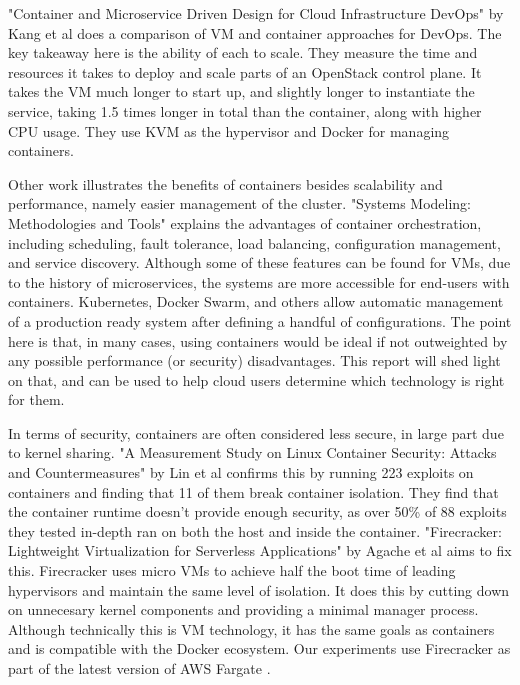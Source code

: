 \documentclass[11pt]{article}
\begin{document}
"Container and Microservice Driven Design for Cloud Infrastructure DevOps" by Kang et al \cite{7484185} does a comparison of VM and container approaches for DevOps. The key takeaway here is the ability of each to scale. They measure the time and resources it takes to deploy and scale parts of an OpenStack control plane. It takes the VM much longer to start up, and slightly longer to instantiate the service, taking 1.5 times longer in total than the container, along with higher CPU usage. They use KVM as the hypervisor and Docker for managing containers.

Other work illustrates the benefits of containers besides scalability and performance, namely easier management of the cluster. "Systems Modeling: Methodologies and Tools" \cite{Casalicchio2019} explains the advantages of container orchestration, including scheduling, fault tolerance, load balancing, configuration management, and service discovery. Although some of these features can be found for VMs, due to the history of microservices, the systems are more accessible for end-users with containers. Kubernetes, Docker Swarm, and others allow automatic management of a production ready system after defining a handful of configurations. The point here is that, in many cases, using containers would be ideal if not outweighted by any possible performance (or security) disadvantages. This report will shed light on that, and can be used to help cloud users determine which technology is right for them.

In terms of security, containers are often considered less secure, in large part due to kernel sharing. "A Measurement Study on Linux Container Security: Attacks and Countermeasures" by Lin et al \cite{10.1145/3274694.3274720} confirms this by running 223 exploits on containers and finding that 11 of them break container isolation. They find that the container runtime doesn't provide enough security, as over 50\% of 88 exploits they tested in-depth ran on both the host and inside the container. "Firecracker: Lightweight Virtualization for Serverless Applications" by Agache et al \cite{246288} aims to fix this. Firecracker uses micro VMs to achieve half the boot time of leading hypervisors and maintain the same level of isolation. It does this by cutting down on unnecesary kernel components and providing a minimal manager process. Although technically this is VM technology, it has the same goals as containers and is compatible with the Docker ecosystem. Our experiments use Firecracker as part of the latest version of AWS Fargate \cite{fargate}.
\end{document}
